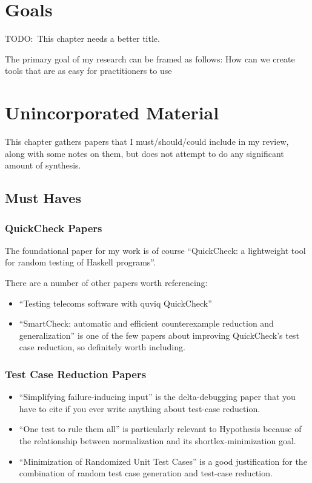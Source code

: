 \chapter{Goals}

TODO:\ This chapter needs a better title.

The primary goal of my research can be framed as follows:
How can we create tools that are as easy for practitioners to use 

\chapter{Unincorporated Material}

This chapter gathers papers that I must/should/could include in my review,
along with some notes on them,
but does not attempt to do any significant amount of synthesis.

\section{Must Haves}

\subsection{QuickCheck Papers}

The foundational paper for my work is of course ``QuickCheck: a lightweight tool for random testing of Haskell programs''\cite{DBLP:conf/icfp/ClaessenH00}.

There are a number of other papers worth referencing:

\begin{itemize}
\item ``Testing telecoms software with quviq QuickCheck''\cite{DBLP:conf/erlang/ArtsHJW06}
\item ``SmartCheck: automatic and efficient counterexample reduction and generalization''\cite{DBLP:conf/haskell/Pike14} is one of the few papers about improving QuickCheck's test case reduction,
so definitely worth including.
\end{itemize}

\subsection{Test Case Reduction Papers}

\begin{itemize}
\item ``Simplifying failure-inducing input''\cite{DBLP:conf/issta/HildebrandtZ00} is the delta-debugging paper that you have to cite if you ever write anything about test-case reduction.
\item ``One test to rule them all''\cite{DBLP:conf/issta/GroceHK17} is particularly relevant to Hypothesis because of the relationship between normalization and its shortlex-minimization goal.
\item ``Minimization of Randomized Unit Test Cases''\cite{DBLP:conf/issre/LeiA05} is a good justification for the combination of random test case generation and test-case reduction.
\end{itemize}


